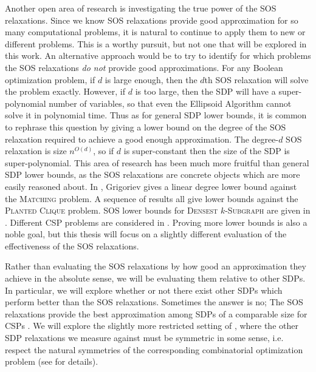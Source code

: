 Another open area of research is investigating the true power of the SOS relaxations.
Since we know SOS relaxations provide good approximation for so many computational problems, it is natural to continue to apply them to new or different problems.
This is a worthy pursuit, but not one that will be explored in this work.
An alternative approach would be to try to identify for which problems the SOS relaxations \emph{do not} provide good approximations.
For any Boolean optimization problem, if $d$ is large enough, then the $d$th SOS relaxation will solve the problem exactly.
However, if $d$ is too large, then the SDP will have a super-polynomial number of variables, so that even the Ellipsoid Algorithm cannot solve it in polynomial time.
Thus as for general SDP lower bounds, it is common to rephrase this question by giving a lower bound on the degree of the SOS relaxation required to achieve a good enough approximation.
The degree-$d$ SOS relaxation is size $n^{O(d)}$, so if $d$ is super-constant then the size of the SDP is super-polynomial.
This area of research has been much more fruitful than general SDP lower bounds, as the SOS relaxations are concrete objects which are more easily reasoned about. 
In \cite{Gri01}, Grigoriev gives a linear degree lower bound against the \textsc{Matching} problem. A sequence of results \cite{MPW15, DM15, RS15, HKP15,BHKKMP16} all give lower bounds against the \textsc{Planted Clique} problem. SOS lower bounds for \textsc{Densest $k$-Subgraph} are given in \cite{BCVGZ12}. Different \textsc{CSP} problems are considered in \cite{Sch08,RS09, GMT09,Tul09,LRS15}.
Proving more lower bounds is also a noble goal, but this thesis will focus on a slightly different evaluation of the effectiveness of the SOS relaxations.


Rather than evaluating the SOS relaxations by how good an approximation they achieve in the absolute sense, we will be evaluating them relative to other SDPs.
In particular, we will explore whether or not there exist other SDPs which perform better than the SOS relaxations.
Sometimes the answer is no; The SOS relaxations provide the best approximation among SDPs of a comparable size for CSPs \cite{LRST14,LRS15}. We will explore the slightly more restricted setting of \cite{LRST14}, where the other SDP relaxations we measure against must be symmetric in some sense, i.e. respect the natural symmetries of the corresponding combinatorial optimization problem (see  for details). 

